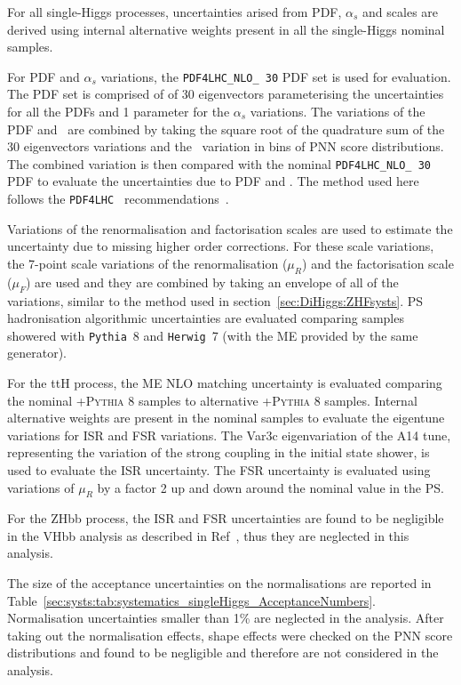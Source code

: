 For all single-Higgs processes, uncertainties arised from PDF, $\alpha_s$ and scales are derived using 
internal alternative weights present in all the single-Higgs nominal samples. 

For PDF and $\alpha_s$ variations, the 
\texttt{PDF4LHC\_NLO\_ 30} PDF set is used for evaluation.
The PDF set is comprised of of 30 eigenvectors parameterising 
the uncertainties for all the PDFs and 1 parameter for the $\alpha_s$ variations.
The variations of the PDF and \alphas\ are combined by 
taking the square root of the quadrature sum of the 30 eigenvectors variations
and the \alphas\ variation in bins of PNN score distributions.
The combined variation is then compared with the nominal \texttt{PDF4LHC\_NLO\_ 30} PDF
to evaluate the uncertainties due to PDF and \alphas.
The method used here follows the \texttt{PDF4LHC }
recommendations~\cite{Butterworth:2015oua}.

Variations of the renormalisation and factorisation scales
are used to estimate the uncertainty due to missing higher 
order corrections. For these scale variations, 
the 7-point scale variations of the renormalisation ($\mu_R$) 
and the factorisation scale ($\mu_F$) are used and they are 
combined by taking an envelope of all of the variations,
similar to the method used in section~\ref{sec:DiHiggs:ZHFsysts}.
PS hadronisation algorithmic uncertainties 
are evaluated comparing samples showered with \texttt{Pythia}~8
and \texttt{Herwig}~7 (with the ME provided by the same generator). 

For the ttH process,
the ME NLO matching uncertainty is evaluated 
comparing the nominal \POWHEG+\textsc{Pythia 8} samples 
to alternative \AMCatNLO+\textsc{Pythia 8} samples. 
Internal alternative weights are 
present in the nominal samples to evaluate the eigentune 
variations for ISR and FSR variations. 
The Var3c eigenvariation of the A14 tune, representing 
the variation of the strong coupling in the initial state shower, 
is used to evaluate the ISR uncertainty. 
The FSR uncertainty is evaluated using variations of $\mu_R$ 
by a factor 2 up and down around the nominal value in the PS. 

For the ZHbb process, the
ISR and FSR uncertainties are found to be negligible in the VHbb 
analysis as described in Ref~\cite{AlKhoury:2690042}, 
thus they are neglected in this analysis. 


The size of the acceptance uncertainties on the normalisations 
are reported in Table~\ref{sec:systs:tab:systematics_singleHiggs_AcceptanceNumbers}. 
Normalisation uncertainties smaller than 1\% are neglected in the analysis. 
After taking out the normalisation effects, 
shape effects were checked on the PNN score distributions 
and found to be negligible 
and therefore are not considered in the analysis.


